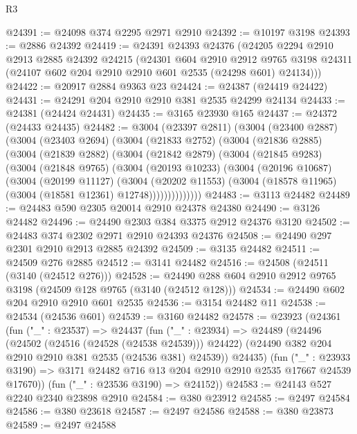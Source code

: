\begin{lexlean}{R3}
\begin{coremodule}
@24391 := @24098 @374 @2295 @2971 @2910
@24392 := @10197 @3198
@24393 := @2886 @24392
@24419 := @24391
    @24393
    @24376
    (@24205
      @2294
      @2910
      @2913
      @2885
      @24392
      @24215
      (@24301
        @604
        @2910
        @2912
        @9765
        @3198
        @24311
        (@24107 @602 @204 @2910 @2910 @601 @2535 (@24298 @601) @24134)))
@24422 := @20917 @2884 @9363 @23
@24424 := @24387 (@24419 @24422)
@24431 := @24291 @204 @2910 @2910 @381 @2535 @24299 @24134
@24433 := @24381 (@24424 @24431)
@24435 := @3165 @23930 @165
@24437 := @24372 (@24433 @24435)
@24482 := @3004
    (@23397 @2811)
    (@3004
      (@23400 @2887)
      (@3004
        (@23403 @2694)
        (@3004
          (@21833 @2752)
          (@3004
            (@21836 @2885)
            (@3004
              (@21839 @2882)
              (@3004
                (@21842 @2879)
                (@3004
                  (@21845 @9283)
                  (@3004
                    (@21848 @9765)
                    (@3004
                      (@20193 @10233)
                      (@3004
                        (@20196 @10687)
                        (@3004
                          (@20199 @11127)
                          (@3004
                            (@20202 @11553)
                            (@3004 (@18578 @11965) (@3004 (@18581 @12361) @12748))))))))))))))
@24483 := @3113 @24482
@24489 := @24483 @590 @2305 @20014 @2910 @24378 @24380
@24490 := @3126 @24482
@24496 := @24490 @2303 @384 @3375 @2912 @24376 @3120
@24502 := @24483 @374 @2302 @2971 @2910 @24393 @24376
@24508 := @24490 @297 @2301 @2910 @2913 @2885 @24392
@24509 := @3135 @24482
@24511 := @24509 @276 @2885
@24512 := @3141 @24482
@24516 := @24508 (@24511 (@3140 (@24512 @276)))
@24528 := @24490 @288 @604 @2910 @2912 @9765 @3198 (@24509 @128 @9765 (@3140 (@24512 @128)))
@24534 := @24490 @602 @204 @2910 @2910 @601 @2535
@24536 := @3154 @24482 @11
@24538 := @24534 (@24536 @601)
@24539 := @3160 @24482
@24578 := @23923
    (@24361
      (fun ("_" : @23537) =>
      @24437
        (fun ("_" : @23934) =>
        @24489
          (@24496
            (@24502 (@24516 (@24528 (@24538 @24539))) @24422)
            (@24490 @382 @204 @2910 @2910 @381 @2535 (@24536 @381) @24539))
          @24435)
        (fun ("_" : @23933 @3190) =>
        @3171 @24482 @716 @13 @204 @2910 @2910 @2535 @17667 @24539 @17670))
      (fun ("_" : @23536 @3190) => @24152))
@24583 := @24143 @527 @2240 @2340 @23898 @2910
@24584 := @380 @23912
@24585 := @2497 @24584
@24586 := @380 @23618
@24587 := @2497 @24586
@24588 := @380 @23873
@24589 := @2497 @24588

\end{coremodule}
\end{lexlean}
